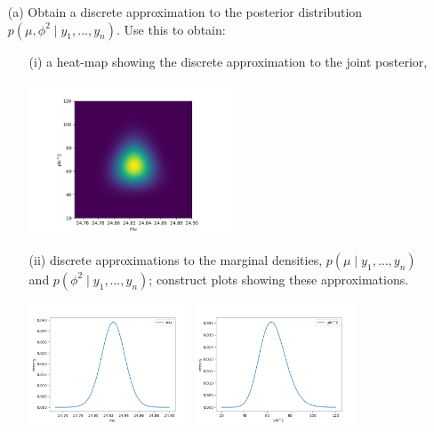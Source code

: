 \documentclass{article}
\newcommand{\1}{\mathbf{1}}
\begin{document}
\newpage
\begin{enumerate}
    \item[(a)] Obtain a discrete approximation to the posterior distribution $p(\mu,\phi^2 \mid y_1,\ldots ,y_n)$. Use this to obtain:
    \begin{enumerate}
        \item[(i)] a heat-map showing the discrete approximation to the joint posterior,
        
        \begin{center}
            \includegraphics[width=0.5\textwidth]{STATS509/HW6/HW6Figures/problem5ai.png}
        \end{center}
        
        \item[(ii)] discrete approximations to the marginal densities, $p(\mu \mid y_1,\ldots ,y_n)$ and $p(\phi^2 \mid y_1,\ldots ,y_n)$; construct plots showing these approximations.
        
         \begin{center}
            \includegraphics[width=0.4\textwidth]{STATS509/HW6/HW6Figures/problem5aii1.png}
            \includegraphics[width=0.4\textwidth]{STATS509/HW6/HW6Figures/problem5aii2.png}
        \end{center}
        

\end{enumerate}
\end{enumerate}
\end{document}
